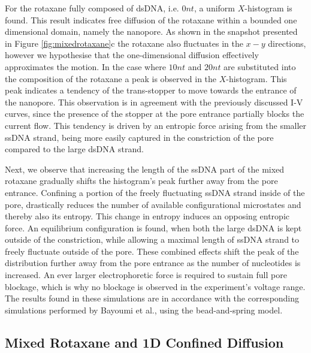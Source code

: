 For the rotaxane fully composed of dsDNA, i.e. $0nt$, a uniform  $X$-histogram is found.
This result indicates free diffusion of the rotaxane within a bounded one dimensional
domain, namely the nanopore. As shown in the snapshot presented in Figure
\ref{fig:mixedrotaxane}c the rotaxane also fluctuates in the $x-y$ directions, however we
hypothesise that the one-dimensional diffusion effectively approximates the motion.
In the case where $10nt$ and $20nt$ are substituted into the composition of the rotaxane
a peak is observed in the $X$-histogram. This peak indicates a tendency of the
trans-stopper to move towards the entrance of the nanopore. This observation is in
agreement with the previously discussed I-V curves, since the presence of the stopper at
the pore entrance partially blocks the current flow. This tendency is driven by an
entropic force arising from the smaller ssDNA strand, being more easily captured in the
constriction of the pore compared to the large dsDNA strand.

Next, we observe that increasing the length of the ssDNA part of the mixed rotaxane
gradually shifts the histogram's peak further away from the pore entrance. Confining a
portion of the freely fluctuating ssDNA strand inside of the pore,
drastically reduces the number of available configurational microstates and thereby also
its entropy. This change in entropy induces an opposing entropic force.
An equilibrium configuration is found, when both the large dsDNA is kept outside of the
constriction, while allowing a maximal length of ssDNA strand to freely fluctuate outside
of the pore. These combined effects shift the peak of the distribution further away from
the pore entrance as the number of nucleotides is increased. An ever larger
electrophoretic force is required to sustain full pore blockage, which is why no blockage
is observed in the experiment's voltage range. The results found in these simulations are
in accordance with the corresponding simulations performed by Bayoumi et al., using
the bead-and-spring model.

\subsection{Mixed Rotaxane and 1D Confined Diffusion}

